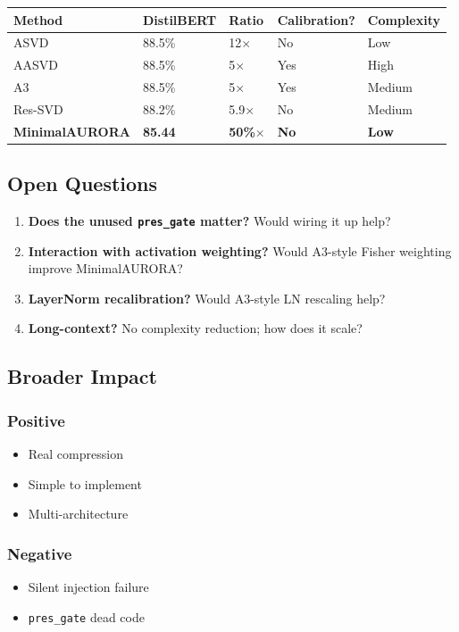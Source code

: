 \begin{table}[H]
\centering
\small
\begin{tabular}{lllll}
\toprule
\textbf{Method} & \textbf{DistilBERT} & \textbf{Ratio} & \textbf{Calibration?} & \textbf{Complexity} \\
\midrule
ASVD & 88.5\% & 12$\times$ & No & Low \\
AASVD & 88.5\% & 5$\times$ & Yes & High \\
A3 & 88.5\% & 5$\times$ & Yes & Medium \\
Res-SVD & 88.2\% & 5.9$\times$ & No & Medium \\
\textbf{MinimalAURORA} & \textbf{85.44} & \textbf{50\%$\times$} & \textbf{No} & \textbf{Low} \\
\bottomrule
\end{tabular}
\end{table}

\subsection{Open Questions}

\begin{enumerate}
\item \textbf{Does the unused \texttt{pres\_gate} matter?} Would wiring it up help?
\item \textbf{Interaction with activation weighting?} Would A3-style Fisher
  weighting improve MinimalAURORA?
\item \textbf{LayerNorm recalibration?} Would A3-style LN rescaling help?
\item \textbf{Long-context?} No complexity reduction; how does it scale?

\end{enumerate}
\subsection{Broader Impact}

\subsubsection{Positive}
\begin{itemize}
\item Real compression
\item Simple to implement
\item Multi-architecture

\end{itemize}
\subsubsection{Negative}
\begin{itemize}
\item Silent injection failure
\item \texttt{pres\_gate} dead code

\end{itemize}
